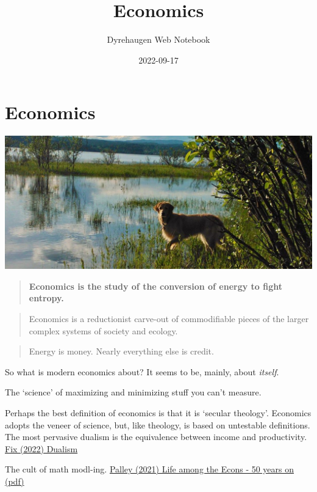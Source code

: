 \documentclass[
]{book}
\title{Economics}
\author{Dyrehaugen Web Notebook}
\date{2022-09-17}
\begin{document}
\maketitle

{
\setcounter{tocdepth}{1}
\tableofcontents
}
\hypertarget{economics}{%
\chapter{Economics}\label{economics}}

\includegraphics{fig/zelda.jpg}

\begin{quote}
\textbf{Economics is the study of the conversion of energy to fight entropy.}
\end{quote}

\begin{quote}
Economics is a reductionist carve-out of commodifiable pieces of the larger complex systems of society and ecology.
\end{quote}

\begin{quote}
Energy is money. Nearly everything else is credit.
\end{quote}

So what is modern economics about? It seems to be, mainly, about \emph{itself}.

The `science' of maximizing and minimizing stuff you can't measure.

Perhaps the best definition of economics is that it is `secular theology'.
Economics adopts the veneer of science, but, like theology, is based on untestable definitions. The most pervasive dualism is the equivalence between income and productivity.
\href{https://economicsfromthetopdown.com/2022/08/10/dualism-in-science-theology-and-economics/}{Fix (2022) Dualism}

The cult of math modl-ing.
\href{pdf/Thomas_Palley_2106_Life_among_the_Econ_50yrs.pdf}{Palley (2021) Life among the Econs - 50 years on (pdf)}
\end{document}
